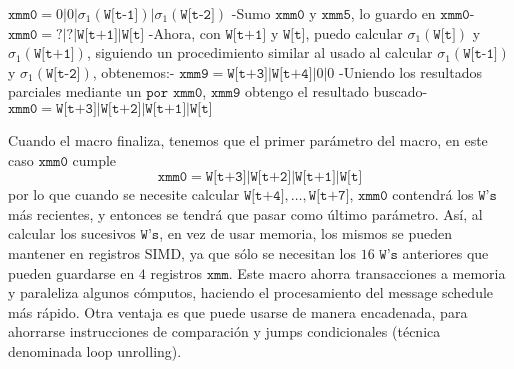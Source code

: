 \begin{algorithm}[H]
\begin{algorithmic}[0]
    \State $\texttt{xmm0} = 0 | 0 | \sigma_1(\texttt{W[t-1]}) |\sigma_1(\texttt{W[t-2]}) $
    \State
    \State -Sumo $\texttt{xmm0}$ y $\texttt{xmm5}$, lo guardo en $\texttt{xmm0}$-
    \State $\texttt{xmm0} = \texttt{?}| \texttt{?}| \texttt{W[t+1]}| \texttt{W[t]}$
    \State -Ahora, con $\texttt{W[t+1]}$ y $\texttt{W[t]}$, puedo calcular $\sigma_1(\texttt{W[t]})$ y $\sigma_1(\texttt{W[t+1]})$, siguiendo un procedimiento similar al usado al calcular $\sigma_1(\texttt{W[t-1]})$ y $\sigma_1(\texttt{W[t-2]})$, obtenemos:-
    \State $\texttt{xmm9} =  \texttt{W[t+3]}| \texttt{W[t+4]} | 0| 0$
    \State
    \State -Uniendo los resultados parciales mediante un $\texttt{por}$ $\texttt{xmm0}$, $\texttt{xmm9}$ obtengo el resultado buscado-
    \State $\texttt{xmm0} = \texttt{W[t+3]}| \texttt{W[t+2]}| \texttt{W[t+1]}| \texttt{W[t]}$
\end{algorithmic}
\end{algorithm}

Cuando el macro finaliza, tenemos que el primer parámetro del macro, en este caso $\texttt{xmm0}$ cumple $$\texttt{xmm0} = \texttt{W[t+3]}| \texttt{W[t+2]}| \texttt{W[t+1]}| \texttt{W[t]}$$ por lo que cuando se necesite calcular $\texttt{W[t+4]}, \dots, \texttt{W[t+7]}$, $\texttt{xmm0}$ contendrá los $\texttt{W's}$ más recientes, y entonces se tendrá que pasar como último parámetro. Así, al calcular los sucesivos $\texttt{W's}$, en vez de usar memoria, los mismos se pueden mantener en registros SIMD, ya que sólo se necesitan los $16$ $\texttt{W's}$ anteriores que pueden guardarse en $4$ registros $\texttt{xmm}$. Este macro ahorra transacciones a memoria y paraleliza algunos cómputos, haciendo el procesamiento del message schedule más rápido. Otra ventaja es que puede usarse de manera encadenada, para ahorrarse instrucciones de comparación y jumps condicionales (técnica denominada loop unrolling). \\


